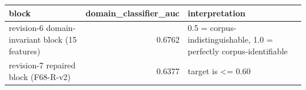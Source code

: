 \begin{tabular}{lrl}
\toprule
block & domain\_classifier\_auc & interpretation \\
\midrule
revision-6 domain-invariant block (15 features) & 0.6762 & 0.5 = corpus-indistinguishable, 1.0 = perfectly corpus-identifiable \\
revision-7 repaired block (F68-R-v2) & 0.6377 & target is <= 0.60 \\
\bottomrule
\end{tabular}
